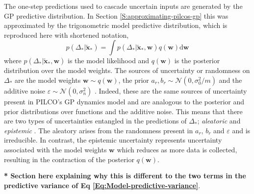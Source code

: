 The one-step predictions used to cascade uncertain inputs are generated by the GP predictive distribution. In Section \ref{S:approximating-pilcos-gp} this was approximated by the trigonometric model predictive distribution, which is reproduced here with shortened notation,
\begin{equation}
    p(\Delta_{*} | \tilde{\mathbf{x}}_{*})=\int p(\Delta_{*} | \tilde{\mathbf{x}}_{*}, \mathbf{w}) q(\mathbf{w}) \mathrm{d} \mathbf{w}
    \label{Eq:Unc-predictive distribution}
\end{equation}
where $p(\Delta_{*} | \tilde{\mathbf{x}}_{*}, \mathbf{w})$ is the model likelihood and $q(\mathbf{w})$ is the posterior distribution over the model weights. The sources of uncertainty or randomness on $\Delta_{*}$ are the model weights $\mathbf{w}\sim q(\mathbf{w})$, the prior $a_{r}, b_{r} \sim \mathcal{N}\left(0,\sigma_{0}^{2}/m\right)$ and the additive noise $\varepsilon \sim \mathcal{N}\left(0,\sigma_{n}^{2} \right)$ \citep{depeweg2017decomposition}. Indeed, these are the same sources of uncertainty present in PILCO's GP dynamics model and are analogous to the posterior and prior distributions over functions and the additive noise. This means that there are two types of uncertainties entangled in the predictions of $\Delta_{*}$; \textit{aleatoric} and \textit{epistemic} \citep{der2009aleatory}\citep{kendall2017uncertainties}. The aleatory arises from the randomness present in $a_{r}$, $b_{r}$ and $\varepsilon$ and is irreducible. In contrast, the epistemic uncertainty represents uncertainty associated with the model weights $\mathbf{w}$ which reduces as more data is collected, resulting in the contraction of the posterior $q(\mathbf{w})$.

\textbf{* Section here explaining why this is different to the two terms in the predictive variance of Eq \ref{Eq:Model-predictive-variance}}.


